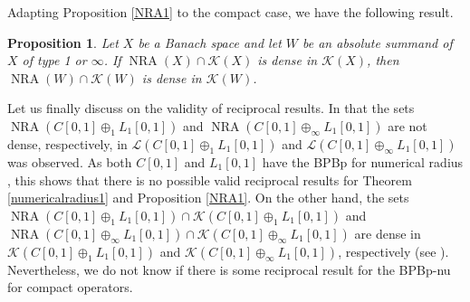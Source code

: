 \documentclass[10pt,a4paper]{amsart}
\theoremstyle{plain}
\newtheorem{prop}[theorem]{Proposition}
\theoremstyle{definition}
\DeclareMathOperator{\NRA}{NRA}
\begin{document}
Adapting Proposition \ref{NRA1} to the compact case, we have the following result.

\begin{prop} \label{NRAK}  Let $X$ be a Banach space and let $W$ be an absolute summand of $X$ of type 1 or $\infty$. If $\NRA(X) \cap \mathcal{K}(X)$ is dense in $\mathcal{K}(X)$, then $\NRA(W) \cap \mathcal{K}(W)$ is dense in $\mathcal{K}(W)$.
\end{prop}


Let us finally discuss on the validity of reciprocal results. In \cite[Remark 2.5]{KLM1} that the sets $\NRA(C[0, 1] \oplus_1 L_1[0, 1])$ and $\NRA(C[0, 1] \oplus_\infty L_1[0, 1])$ are not dense, respectively, in $\mathcal{L}(C[0, 1] \oplus_1 L_1[0, 1])$ and $\mathcal{L}(C[0, 1] \oplus_\infty L_1[0, 1])$ was observed. As both $C[0,1]$ and $L_1[0,1]$ have the BPBp for numerical radius \cite{AGR,KLM1}, this shows that there is no possible valid reciprocal results for Theorem \ref{numericalradius1} and Proposition \ref{NRA1}. On the other hand,  the sets $\NRA(C[0, 1] \oplus_1 L_1[0, 1]) \cap \mathcal{K}(C[0, 1] \oplus_{1} L_1[0, 1])$ and $\NRA(C[0, 1] \oplus_{\infty} L_1[0, 1]) \cap \mathcal{K}(C[0, 1] \oplus_{\infty} L_1[0, 1])$ are dense in $\mathcal{K}(C[0, 1] \oplus_1 L_1[0, 1])$ and $\mathcal{K}(C[0, 1] \oplus_{\infty} L_1[0, 1])$, respectively (see \cite[Example 3.4]{CapMM}). Nevertheless, we do not know if there is some reciprocal result for the BPBp-nu for compact operators.
\end{document}
